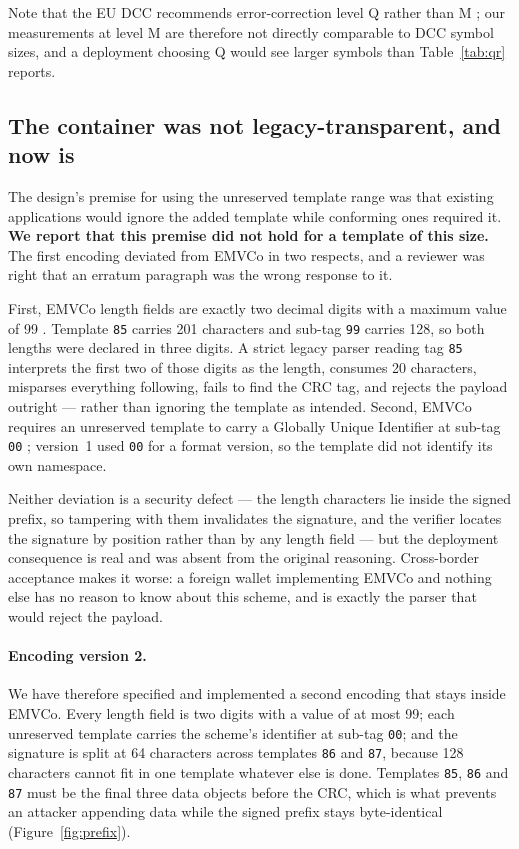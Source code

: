 \documentclass[10pt,a4paper,twocolumn]{article}
\newcommand{\code}[1]{\texttt{\small #1}}
\begin{document}
Note that the EU DCC recommends error-correction level Q rather than M
\citep{eudcc2021}; our measurements at level M are therefore not directly
comparable to DCC symbol sizes, and a deployment choosing Q would see larger
symbols than Table~\ref{tab:qr} reports.

\subsection{The container was not legacy-transparent, and now is}
\label{sec:container}

The design's premise for using the unreserved template range was that existing
applications would ignore the added template while conforming ones required it.
\textbf{We report that this premise did not hold for a template of this size.}
The first encoding deviated from EMVCo in two respects, and a reviewer was
right that an erratum paragraph was the wrong response to it.

First, EMVCo length fields are exactly two decimal digits with a maximum value
of 99 \citep{emvco2017mpm}. Template \code{85} carries 201 characters and
sub-tag \code{99} carries 128, so both lengths were declared in three digits. A
strict legacy parser reading tag \code{85} interprets the first two of those
digits as the length, consumes 20 characters, misparses everything following,
fails to find the CRC tag, and rejects the payload outright --- rather than
ignoring the template as intended. Second, EMVCo requires an unreserved
template to carry a Globally Unique Identifier at sub-tag \code{00}
\citep{emvco2017mpm}; version~1 used \code{00} for a format version, so the
template did not identify its own namespace.

Neither deviation is a security defect --- the length characters lie inside the
signed prefix, so tampering with them invalidates the signature, and the
verifier locates the signature by position rather than by any length field ---
but the deployment consequence is real and was absent from the original
reasoning. Cross-border acceptance makes it worse: a foreign wallet
implementing EMVCo and nothing else has no reason to know about this scheme,
and is exactly the parser that would reject the payload.

\paragraph{Encoding version 2.} We have therefore specified and implemented a
second encoding that stays inside EMVCo. Every length field is two digits with
a value of at most 99; each unreserved template carries the scheme's identifier
at sub-tag \code{00}; and the signature is split at 64 characters across
templates \code{86} and \code{87}, because 128 characters cannot fit in one
template whatever else is done. Templates \code{85}, \code{86} and \code{87}
must be the final three data objects before the CRC, which is what prevents an
attacker appending data while the signed prefix stays byte-identical
(Figure~\ref{fig:prefix}).
\end{document}
